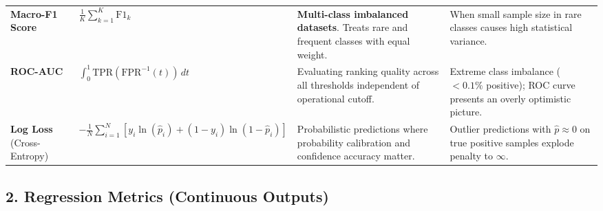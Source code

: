 \begin{table}[htbp]
\begin{tabular}{@{}p{2.8cm}p{4.2cm}p{4.2cm}p{3.2cm}@{}}
\textbf{Macro-F1 Score} & 
$\frac{1}{K} \sum_{k=1}^K \text{F1}_k$ & 
\textbf{Multi-class imbalanced datasets}. Treats rare and frequent classes with equal weight. & 
When small sample size in rare classes causes high statistical variance. \\ \addlinespace

\textbf{ROC-AUC} & 
$\int_0^1 \text{TPR}(\text{FPR}^{-1}(t)) \, dt$ & 
Evaluating ranking quality across all thresholds independent of operational cutoff. & 
Extreme class imbalance ($< 0.1\%$ positive); ROC curve presents an overly optimistic picture. \\ \addlinespace

\textbf{Log Loss} (Cross-Entropy) & 
$-\frac{1}{N} \sum_{i=1}^N [y_i \ln(\hat{p}_i) + (1-y_i)\ln(1-\hat{p}_i)]$ & 
Probabilistic predictions where probability calibration and confidence accuracy matter. & 
Outlier predictions with $\hat{p} \approx 0$ on true positive samples explode penalty to $\infty$. \\ \bottomrule
\end{tabular}
\end{table}

\subsection*{2. Regression Metrics (Continuous Outputs)}


